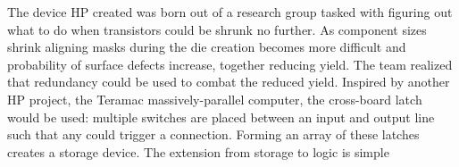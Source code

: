\documentclass[12pt]{article}
\begin{document}
The device HP created was born out of a research group tasked with figuring out
what to do when transistors could be shrunk no further\cite{williams2008we}.
As component sizes shrink aligning masks during the die creation becomes more
difficult and probability of surface defects increase, together reducing
yield\cite{snider2008molecular}.  The team realized that redundancy could be
used to combat the reduced yield.  Inspired by another HP project, the
Teramac\cite{heath1998} massively-parallel computer, the cross-board latch
would be used: multiple switches are placed between an input and output line
such that any could trigger a connection.  Forming an array of these latches
creates a storage device.
The extension from storage to logic is simple


\end{document}
